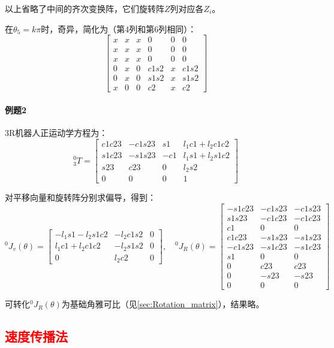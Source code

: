 \documentclass[
12pt, %
a4paper, 
oneside, %
]{scrartcl}
\begin{document}
{以上省略了中间的齐次变换阵，它们旋转阵$ Z $列对应各$ Z_i $。

在$ \theta_5 = k\pi $时，奇异，简化为（第4列和第6列相同）：
$$ \begin{bmatrix} x & x & x & 0 & 0 & 0 \\ x & x & x & 0 & 0 & 0 \\ x & x & x & 0 & 0 & 0 \\ 0 & x & 0 & c1 s2 & x & c1 s2 \\ 0 & x & 0 & s1 s2 & x & s1 s2 \\ x & 0 & 0 & c2 & x & c2 \end{bmatrix} $$
}
\paragraph{例题2}\label{sec:example4.2}
{\footnotesize
3R机器人正运动学方程为：
$$ {}_3^0 T = \begin{bmatrix} c1 c23 & -c1 s23 & s1 & l_1 c1 + l_2 c1 c2 \\ s1 c23 & -s1 s23 & -c1 & l_1 s1 + l_2 s1 c2 \\ s23 & c23 & 0 & l_2 s2 \\ 0 & 0 & 0 & 1 \end{bmatrix} $$

对平移向量和旋转阵分别求偏导，得到：
$$
{}^0 J_v(\theta) = \begin{bmatrix} -l_1 s1 - l_2 s1 c2 & -l_2 c1 s2 & 0 \\ l_1 c1 + l_2 c1 c2 & -l_2 s1 s2 & 0 \\ 0 & l_2 c2 & 0 \end{bmatrix}, \quad
{}^0 J_R(\theta) = \begin{bmatrix} -s1 c23 & -c1 s23 & -c1 s23 \\ s1 s23 & -c1 c23 & -c1 c23 \\ c1 & 0 & 0 \\ c1 c23 & -s1 s23 & -s1 s23 \\ -c1 s23 & -s1 c23 & -s1 c23 \\ s1 & 0 & 0 \\ 0 & c23 & c23 \\ 0 & -s23 & -s23 \\ 0 & 0 & 0 \end{bmatrix}
$$

可转化$ {}^0 J_R(\theta) $为基础角雅可比（见\ref{sec:Rotation_matrix}），结果略。
}
\subsection[速度传播法]{\textcolor{red}{速度传播法}}
\end{document}
